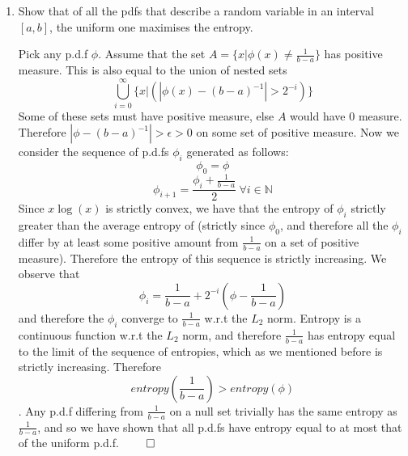 \documentclass{article}
\newcommand{\chapternumber}{2}
\newenvironment{QandA}{\begin{enumerate}[label=\chapternumber.\arabic*]\bfseries\boldmath}
	{\end{enumerate}}
\newenvironment{answered}{\par\bigskip\normalfont\unboldmath}{}
\begin{document}
\begin{QandA}
\begin{answered}
	\end{answered}

	\item Show that of all the pdfs that describe a random variable in an interval $[a,b]$, the uniform one maximises the entropy.
	\begin{answered}
		Pick any p.d.f $\phi$. Assume that the set $A=\{x|\phi(x)\neq\frac{1}{b-a}\}$ has positive measure. This is also equal to the union of nested sets
		\[\bigcup_{i=0}^\infty\{x|(|\phi(x)-(b-a)^{-1}|>2^{-i})\}\]
		Some of these sets must have positive measure, else $A$ would have 0 measure. Therefore $|\phi-(b-a)^{-1}|>\epsilon>0$ on some set of positive measure.
		Now we consider the sequence of p.d.fs $\phi_i$ generated as follows:
		\[\phi_0=\phi\]
		\[\phi_{i+1}=\frac{\phi_i+\frac{1}{b-a}}{2}\ \forall i\in \mathbb{N}\]
		Since $x\log(x)$ is strictly convex, we have that the entropy of $\phi_i$ strictly greater than the average entropy of (strictly since $\phi_0$, and therefore all the $\phi_i$ differ by at least some positive amount from $\frac{1}{b-a}$ on a set of positive measure). Therefore the entropy of this sequence is strictly increasing. We observe that
		\[\phi_i=\frac{1}{b-a}+2^{-i}\left(\phi-\frac{1}{b-a}\right)\]
		and therefore the $\phi_i$ converge to $\frac{1}{b-a}$ w.r.t the $L_2$ norm. Entropy is a continuous function w.r.t the $L_2$ norm, and therefore $\frac{1}{b-a}$ has entropy equal to the limit of the sequence of entropies, which as we mentioned before is strictly increasing. Therefore 
		\[entropy\left(\frac{1}{b-a}\right)>entropy(\phi)\].
		Any p.d.f differing from $\frac{1}{b-a}$ on a null set trivially has the same entropy as $\frac{1}{b-a}$, and so we have shown that all p.d.fs have entropy equal to at most that of the uniform p.d.f. $\qed$
	\end{answered}
	
	\end{QandA}
\end{document}
